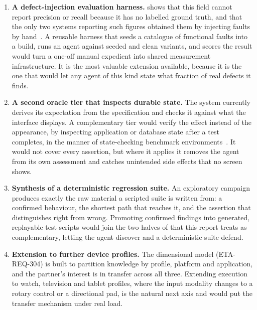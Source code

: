 \begin{enumerate}[label=\textbf{F\arabic*.},leftmargin=3.0em]
  \item \textbf{A defect-injection evaluation harness.} 
    shows that this field cannot report precision or recall because it has no
    labelled ground truth, and that the only two systems reporting such figures
    obtained them by injecting faults by hand~\cite{auitestagent}. A reusable
    harness that seeds a catalogue of functional faults into a build, runs an
    agent against seeded and clean variants, and scores the result would turn a
    one-off manual expedient into shared measurement infrastructure. It is the
    most valuable extension available, because it is the one that would let any
    agent of this kind state what fraction of real defects it finds.

  \item \textbf{A second oracle tier that inspects durable state.} The system
    currently derives its expectation from the specification and checks it
    against what the interface displays. A complementary tier would verify the
    effect instead of the appearance, by inspecting application or database
    state after a test completes, in the manner of state-checking benchmark
    environments~\cite{androidworld,appworld}. It would not cover every
    assertion, but where it applies it removes the agent from its own
    assessment and catches unintended side effects that no screen shows.

  \item \textbf{Synthesis of a deterministic regression suite.} An exploratory
    campaign produces exactly the raw material a scripted suite is written from:
    a confirmed behaviour, the shortest path that reaches it, and the assertion
    that distinguishes right from wrong. Promoting confirmed findings into
    generated, replayable test scripts would join the two halves of
     that this report treats as complementary, letting
    the agent discover and a deterministic suite defend.

  \item \textbf{Extension to further device profiles.} The dimensional model
    (ETA-REQ-304) is built to partition knowledge by profile, platform and
    application, and the partner's interest is in transfer across all three.
    Extending execution to watch, television and tablet profiles, where the
    input modality changes to a rotary control or a directional pad, is the
    natural next axis and would put the transfer mechanism under real load.


\end{enumerate}
